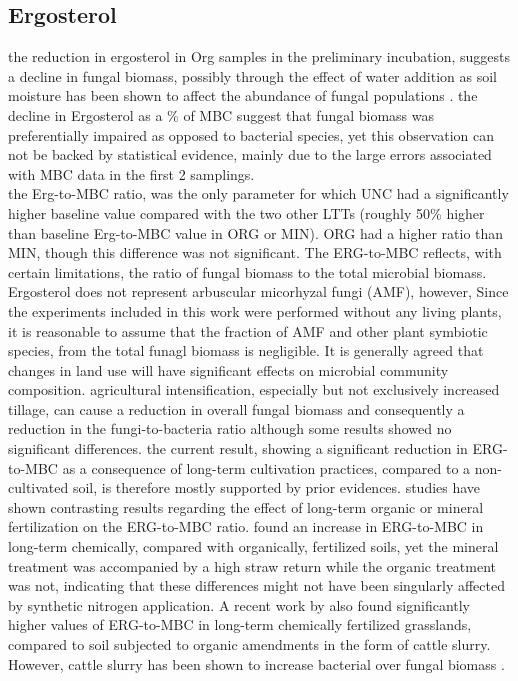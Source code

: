 \documentclass[12pt]{report}
\begin{document}
		\subsection{Ergosterol}
		the reduction in ergosterol in Org samples in the preliminary incubation, suggests a decline in fungal biomass, possibly through the effect of water addition as soil moisture has been shown to affect the abundance of fungal populations \citep{drenovsky2004, griffin1963}. the decline in Ergosterol as a \% of MBC suggest that fungal biomass was preferentially impaired as opposed to bacterial species, yet this observation can not be backed by statistical evidence, mainly due to the large errors associated with MBC data in the first 2 samplings.\\
		the Erg-to-MBC ratio, was the only parameter for which UNC had a significantly higher baseline value compared with the two other LTTs (roughly 50\% higher than baseline Erg-to-MBC value in ORG or MIN).
		ORG had a higher ratio than MIN, though this difference was not significant. The ERG-to-MBC reflects, with certain limitations, the ratio of fungal biomass to the total microbial biomass. Ergosterol does not represent arbuscular micorhyzal fungi (AMF), however, Since the experiments included in this work were performed without any living plants, it is reasonable to assume that the fraction of AMF and other plant symbiotic species, from the total funagl biomass is negligible.
		It is generally agreed that changes in land use will have significant effects on microbial community composition\myRed{*}. agricultural intensification, especially but not exclusively increased tillage, can cause a reduction in overall fungal biomass and consequently a reduction in the fungi-to-bacteria ratio\myRed{*} although some results showed no significant differences\myRed{*}.
		the current result, showing a significant reduction in ERG-to-MBC as a consequence of long-term cultivation practices, compared to a non-cultivated soil, is therefore mostly supported by prior evidences.
		studies have shown contrasting results regarding the effect of long-term organic or mineral fertilization on the ERG-to-MBC ratio. \citet{heinze2010} found an increase in ERG-to-MBC in long-term chemically, compared with organically, fertilized soils, yet the mineral treatment was accompanied by a high straw return while the organic treatment was not, indicating that these differences might not have been  singularly affected by synthetic nitrogen application. A recent work by \citet{knoblauch2017} also found significantly higher values of ERG-to-MBC in long-term chemically fertilized grasslands, compared to soil subjected to organic amendments in the form of cattle slurry. However, cattle slurry has been shown to increase bacterial over fungal biomass \citet{knoblauch2017}.
\end{document}
